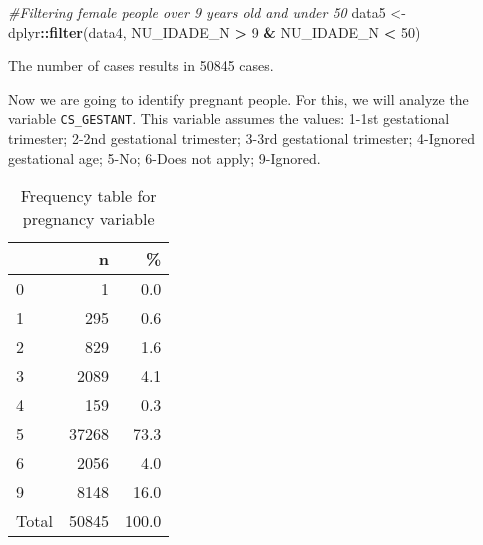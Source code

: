 \documentclass[
]{article}
\newenvironment{Shaded}{\begin{snugshade}}{\end{snugshade}}
\newcommand{\CommentTok}[1]{\textcolor[rgb]{0.56,0.35,0.01}{\textit{#1}}}
\newcommand{\DataTypeTok}[1]{\textcolor[rgb]{0.13,0.29,0.53}{#1}}
\newcommand{\DecValTok}[1]{\textcolor[rgb]{0.00,0.00,0.81}{#1}}
\newcommand{\KeywordTok}[1]{\textcolor[rgb]{0.13,0.29,0.53}{\textbf{#1}}}
\newcommand{\NormalTok}[1]{#1}
\newcommand{\OperatorTok}[1]{\textcolor[rgb]{0.81,0.36,0.00}{\textbf{#1}}}
\newcommand{\OtherTok}[1]{\textcolor[rgb]{0.56,0.35,0.01}{#1}}
\newcommand{\StringTok}[1]{\textcolor[rgb]{0.31,0.60,0.02}{#1}}
\begin{document}
\begin{Shaded}
\begin{Highlighting}[]
\CommentTok{#Filtering female people over 9 years old and under 50}
\NormalTok{data5 <-}\StringTok{ }\NormalTok{dplyr}\OperatorTok{::}\KeywordTok{filter}\NormalTok{(data4, NU_IDADE_N }\OperatorTok{>}\StringTok{ }\DecValTok{9} \OperatorTok{&}\StringTok{ }\NormalTok{NU_IDADE_N }\OperatorTok{<}\StringTok{ }\DecValTok{50}\NormalTok{)}
\end{Highlighting}
\end{Shaded}

The number of cases results in 50845 cases.

Now we are going to identify pregnant people. For this, we will analyze
the variable \texttt{CS\_GESTANT}. This variable assumes the values:
1-1st gestational trimester; 2-2nd gestational trimester; 3-3rd
gestational trimester; 4-Ignored gestational age; 5-No; 6-Does not
apply; 9-Ignored.

\begin{Shaded}
\end{Shaded}

\begin{table}[!h]

\caption{\label{tab:unnamed-chunk-9}Frequency table for pregnancy variable}
\centering
\begin{tabular}[t]{l|r|r}
\hline
  & n & \%\\
\hline
0 & 1 & 0.0\\
\hline
1 & 295 & 0.6\\
\hline
2 & 829 & 1.6\\
\hline
3 & 2089 & 4.1\\
\hline
4 & 159 & 0.3\\
\hline
5 & 37268 & 73.3\\
\hline
6 & 2056 & 4.0\\
\hline
9 & 8148 & 16.0\\
\hline
Total & 50845 & 100.0\\
\hline
\end{tabular}
\end{table}
\end{document}
